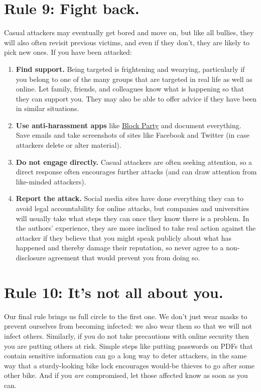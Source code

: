 \documentclass[10pt,letterpaper]{article}
\begin{document}
\section*{Rule 9: Fight back.}

Casual attackers may eventually get bored and move on, but like all bullies,
they will also often revisit previous victims, and even if they don't, they are
likely to pick new ones. If you have been attacked:

\begin{enumerate}
\item
  \textbf{Find support.} Being targeted is frightening and wearying,
  particularly if you belong to one of the many groups that are targeted in real
  life as well as online. Let family, friends, and colleagues know what is
  happening so that they can support you. They may also be able to offer advice
  if they have been in similar situations.

\item
  \textbf{Use anti-harassment apps}
  like \href{https://www.blockpartyapp.com/}{{Block Party}} and document
  everything. Save emails and take screenshots of sites like Facebook and
  Twitter (in case attackers delete or alter material).

\item
  \textbf{Do not engage directly.} Casual attackers are often seeking attention,
  so a direct response often encourages further attacks (and can draw attention
  from like-minded attackers).

\item
  \textbf{Report the attack.} Social media sites have done everything they can
  to avoid legal accountability for online attacks, but companies and
  universities will usually take what steps they can once they know there is a
  problem. In the authors' experience, they are more inclined to take real
  action against the attacker if they believe that you might speak publicly
  about what has happened and thereby damage their reputation, so never agree to
  a non-disclosure agreement that would prevent you from doing so.
\end{enumerate}

\section*{Rule 10: It's not all about you.}

Our final rule brings us full circle to the first one. We don't just wear masks
to prevent ourselves from becoming infected: we also wear them so that we will
not infect others. Similarly, if you do not take precautions with online
security then you are putting others at risk.  Simple steps like putting
passwords on PDFs that contain sensitive information can go a long way to deter
attackers, in the same way that a sturdy-looking bike lock encourages would-be
thieves to go after some other bike. And if you \emph{are} compromised, let
those affected know as soon as you can.
\end{document}
